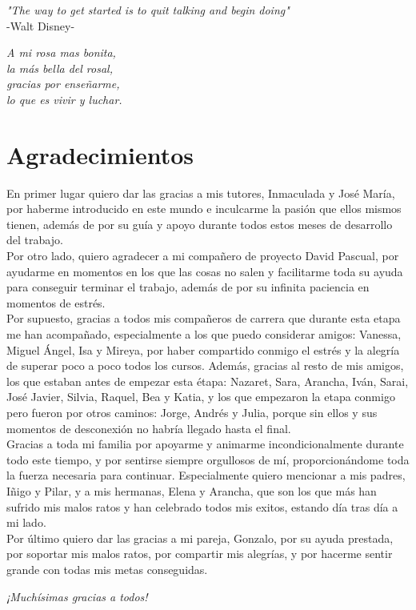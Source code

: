 {
	\vspace*{1cm}
	\begin{flushright}
		\textit{"The way to get started is to quit talking and begin doing"}\\
		\vspace{10pt}
		-Walt Disney-
	\end{flushright}
	
	\vspace*{14cm}
	\begin{flushright}
		\textit{A mi rosa mas bonita,\\
		la más bella del rosal,\\
		gracias por enseñarme,\\
		lo que es vivir y luchar.}
	\end{flushright}
}

\chapter*{Agradecimientos}

En primer lugar quiero dar las gracias a mis tutores, Inmaculada y José María, por haberme introducido en este mundo e inculcarme la pasión que ellos mismos tienen, además de por su guía y apoyo durante todos estos meses de desarrollo del trabajo.\\
 
Por otro lado, quiero agradecer a mi compañero de proyecto David Pascual, por ayudarme en momentos en los que las cosas no salen y facilitarme toda su ayuda para conseguir terminar el trabajo, además de por su infinita paciencia en momentos de estrés.\\

Por supuesto, gracias a todos mis compañeros de carrera que durante esta etapa me han acompañado, especialmente a los que puedo considerar amigos: Vanessa, Miguel Ángel, Isa y Mireya, por haber compartido conmigo el estrés y la alegría de superar poco a poco todos los cursos. Además, gracias al resto de mis amigos, los que estaban antes de empezar esta étapa: Nazaret, Sara, Arancha, Iván, Sarai, José Javier, Silvia, Raquel, Bea y Katia, y los que empezaron la etapa conmigo pero fueron por otros caminos: Jorge, Andrés y Julia, porque sin ellos y sus momentos de desconexión no habría llegado hasta el final.\\

Gracias a toda mi familia por apoyarme y animarme incondicionalmente durante todo este tiempo, y por sentirse siempre orgullosos de mí, proporcionándome toda la fuerza necesaria para continuar. Especialmente quiero mencionar a mis padres, Iñigo y Pilar, y a mis hermanas, Elena y Arancha, que son los que más han sufrido mis malos ratos y han celebrado todos mis exitos, estando día tras día a mi lado.\\

Por último quiero dar las gracias a mi pareja, Gonzalo, por su ayuda prestada, por soportar mis malos ratos, por compartir mis alegrías, y por hacerme sentir grande con todas mis metas conseguidas.\\

\begin{flushright}
	\emph{¡Muchí­simas gracias a todos!}
\end{flushright}